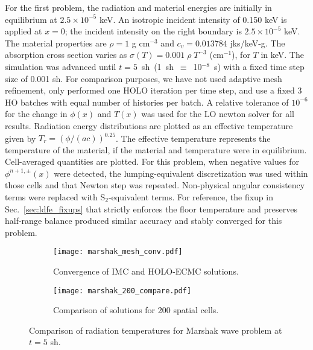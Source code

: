 For the first problem, the radiation and material energies are initially in
equilibrium at $2.5\times 10^{-5}$ keV.   An isotropic incident intensity of 0.150 keV is applied
at $x=0$; the incident intensity on the right boundary is $2.5\times10^{-5}$ keV.
The material properties are $\rho = 1$ g cm$^{-3}$ and $c_v = 0.013784$ jks/keV-g. The
absorption cross section varies as $\sigma(T) = 0.001\;\rho\; T^{-3}$ (cm$^{-1}$), for $T$
in keV.
The simulation was advanced until $t=5$~sh~(1~sh~$\equiv$~10$^{-8}$~s) with a fixed time step size of 0.001 sh. For comparison purposes, we
have not used adaptive mesh
refinement, only performed one HOLO iteration per time
step, and use a fixed 3 HO batches with equal number of histories per batch. A
relative tolerance of $10^{-6}$ for the change in $\phi(x)$ and $T(x)$ was used for
the LO newton solver for all results. Radiation energy
distributions are plotted as an effective temperature given by
$T_r=(\phi/(ac))^{0.25}$.  The effective temperature represents the temperature of the
material, if the material and temperature were in equilibrium.  Cell-averaged quantities are plotted.
For this problem, when negative values for $\phi^{n+1,\pm}(x)$ were detected, the lumping-equivalent
discretization was used within those cells and that Newton step was repeated.
Non-physical angular consistency terms were replaced with S$_2$-equivalent terms. For
reference, the fixup in Sec.~\ref{sec:ldfe_fixups} that strictly enforces the floor temperature and preserves half-range
balance produced similar accuracy and stably converged for this problem.
\begin{figure}[hp]
    \centering
\begin{subfigure}{0.7\textwidth}
  \centering
    \texttt{[image: marshak\_mesh\_conv.pdf]}
    \caption{\label{marshak_mesh_conv} Convergence of IMC and HOLO-ECMC solutions.}
\end{subfigure}
\begin{subfigure}{0.7\textwidth}
  \centering
  \texttt{[image: marshak\_200\_compare.pdf]}
  \caption{\label{marshak_200_compare}  Comparison of solutions for 200 spatial cells. }
\end{subfigure}
\caption{Comparison of radiation temperatures for Marshak wave problem at ${t=5}$ sh.}
\end{figure}

